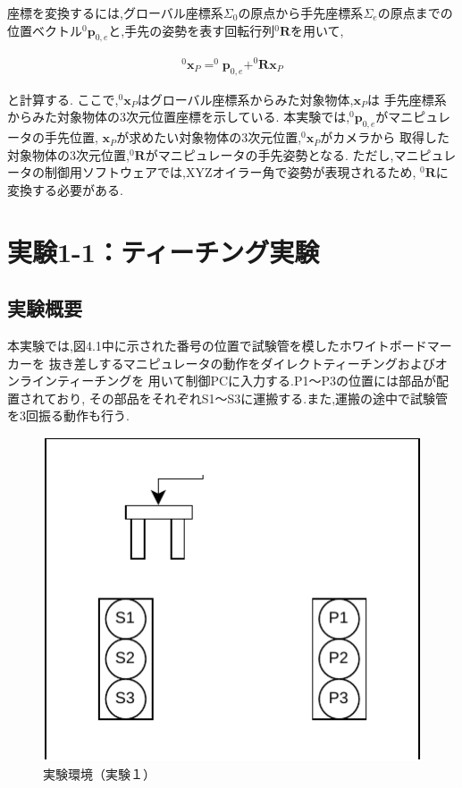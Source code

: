 座標を変換するには,グローバル座標系$\Sigma_0$の原点から手先座標系$\Sigma_e$の原点までの
位置ベクトル$^0\mathbf{p}_{0,e}$と,手先の姿勢を表す回転行列$^0\mathbf{R}$を用いて,

\begin{align}
  ^0\mathbf{x}_{P} = ^0\mathbf{p}_{0,e} + ^0\mathbf{R} \mathbf{x}_{P} \tag{3.1}
\end{align}

と計算する.
ここで,$^0\mathbf{x}_{P}$はグローバル座標系からみた対象物体,$\mathbf{x}_{P}$は
手先座標系からみた対象物体の3次元位置座標を示している.
本実験では,$^0\mathbf{p}_{0,e}$がマニピュレータの手先位置,
$\mathbf{x}_{P}$が求めたい対象物体の3次元位置,$^0\mathbf{x}_{P}$がカメラから
取得した対象物体の3次元位置,$^0\mathbf{R}$がマニピュレータの手先姿勢となる.
ただし,マニピュレータの制御用ソフトウェアでは,XYZオイラー角で姿勢が表現されるため,
$^0\mathbf{R}$に変換する必要がある.


\section{実験1-1：ティーチング実験}

\subsection{実験概要}
本実験では,図4.1中に示された番号の位置で試験管を模したホワイトボードマーカーを
抜き差しするマニピュレータの動作をダイレクトティーチングおよびオンラインティーチングを
用いて制御PCに入力する.P1～P3の位置には部品が配置されており,
その部品をそれぞれS1～S3に運搬する.また,運搬の途中で試験管を3回振る動作も行う.

\begin{figure}[h]
  \centering
  \includegraphics[scale=0.6]{sozai/2.pdf}
  \caption{実験環境（実験１）}
\end{figure}


